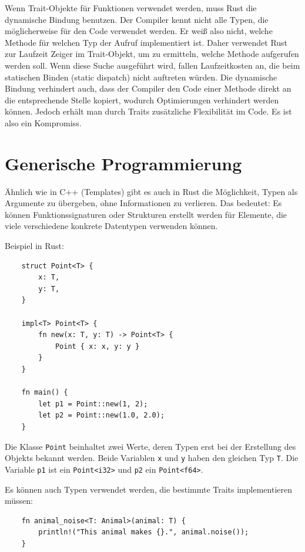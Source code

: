 Wenn Trait-Objekte für Funktionen verwendet werden, muss Rust die dynamische Bindung benutzen. Der Compiler kennt nicht alle Typen, die möglicherweise für den Code verwendet werden. Er weiß also nicht, welche Methode für welchen Typ der Aufruf implementiert ist. Daher verwendet Rust zur Laufzeit Zeiger im Trait-Objekt, um zu ermitteln, welche Methode aufgerufen werden soll. Wenn diese Suche ausgeführt wird, fallen Laufzeitkosten an, die beim statischen Binden (sta\-tic dispatch) nicht auftreten würden. Die dynamische Bindung verhindert auch, dass der Compiler den Code einer Methode direkt an die entsprechende Stelle kopiert, wodurch Optimierungen verhindert werden können. Jedoch erhält man durch Traits zusätzliche Flexibilität im Code. Es ist also ein Kompromiss.

\section{Generische Programmierung}

Ähnlich wie in C++ (Templates) gibt es auch in Rust die Möglichkeit, Typen als Argumente zu übergeben, ohne Informationen zu verlieren. Das bedeutet: Es können Funktionssignaturen oder Strukturen erstellt werden für Elemente, die viele verschiedene konkrete Datentypen verwenden können.

Beispiel in Rust:

\begin{lstlisting}
    struct Point<T> {
        x: T,
        y: T,
    }
    
    impl<T> Point<T> {
        fn new(x: T, y: T) -> Point<T> {
            Point { x: x, y: y }
        }
    }
    
    fn main() {
        let p1 = Point::new(1, 2);
        let p2 = Point::new(1.0, 2.0);
    }
\end{lstlisting}

Die Klasse \verb"Point" beinhaltet zwei Werte, deren Typen erst bei der Erstellung des Objekts bekannt werden. Beide Variablen \verb"x" und \verb"y" haben den gleichen Typ \verb"T". Die Variable \verb"p1" ist ein \verb"Point<i32>" und \verb"p2" ein \verb"Point<f64>".

Es können auch Typen verwendet werden, die bestimmte Traits implementieren müssen:

\begin{lstlisting}
    fn animal_noise<T: Animal>(animal: T) {
        println!("This animal makes {}.", animal.noise());
    }
\end{lstlisting}

